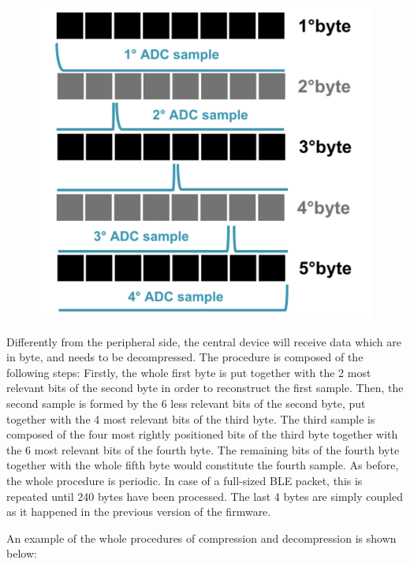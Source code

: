 \documentclass{Configuration_Files/PoliMi3i_thesis}
\begin{document}
\begin{figure}[H]
    \centering
    \includegraphics[scale=0.7]{Shift Algorithm/Screenshot 2024-07-22 at 22.31.56.png}
    \label{fig:pairing_procedure}
\end{figure}

Differently from the peripheral side, the central device will receive data which are in byte, and needs to be decompressed. The procedure is composed of the following steps:
Firstly, the whole first byte is put together with the 2 most relevant bits of the second byte in order to reconstruct the first sample. Then, the second sample is formed by the 6 less relevant bits of the second byte, put together with the 4 most relevant bits of the third byte. The third sample is composed of the four most rightly positioned bits of the third byte together with the 6 most relevant bits of the fourth byte. The remaining bits of the fourth byte together with the whole fifth byte would constitute the fourth sample. As before, the whole procedure is periodic. In case of a full-sized BLE packet, this is repeated until 240 bytes have been processed. The last 4 bytes are simply coupled as it happened in the previous version of the firmware.

An example of the whole procedures of compression and decompression is shown below: 
\end{document}
